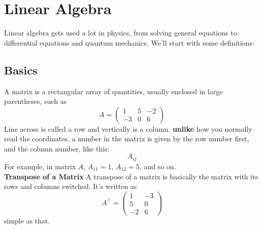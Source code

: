 \documentclass[oneside]{book}
\numberwithin{equation}{chapter} %
\begin{document}
\chapter{Linear Algebra}
Linear algebra gets used a lot in physics, from solving general equations to differential equations  and quantum mechanics. We'll start with some definitions:
\section{Basics}
A matrix is a rectangular array of quantities, usually enclosed in large parentheses, such as 
$$
A=
\begin{pmatrix}
	1&5&-2\\-3&0&6
\end{pmatrix}
$$
Line across is called a row and vertically is a column. \textbf{unlike} how you normally read the coordinates, a number in the matrix is given by the row number first, and the column number,  like this:
$$A_{ij}$$
For example, in matrix $A$, $A_{11}=1$, $A_{12}=5$, and so on.\\

\textbf{Transpose of a Matrix}	A transpose of a matrix is basically the matrix with its rows and columns switched. It's written as 
$$
A^\intercal=
\begin{pmatrix}
	1&-3\\5&0\\-2&6
\end{pmatrix}
$$
simple as that.\\
\end{document}
